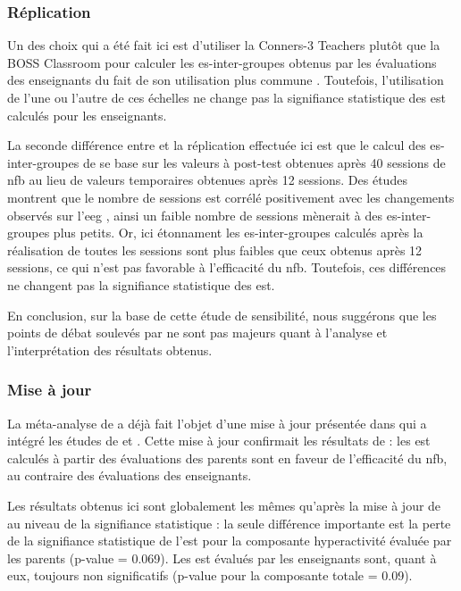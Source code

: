 \begin{itemize}
\subsubsection{Réplication}

Un des choix qui a été fait ici est d'utiliser la Conners-3 Teachers \citep{Conners2008} plutôt que la BOSS Classroom \citep{Shapiro2010} 
pour calculer les \gls{es}-inter-groupes obtenus par les évaluations des enseignants du fait de son utilisation plus commune \citep{Christiansen2014, Bluschke2016}.
Toutefois, l'utilisation de l'une ou l'autre de ces échelles ne change pas la signifiance statistique des \gls{est} calculés pour les enseignants. 

La seconde différence entre \citep{Cortese2016} et la réplication effectuée ici est que le calcul des \gls{es}-inter-groupes de \citet{Arnold2014} se base 
sur les valeurs à post-test obtenues après 40 sessions de \gls{nfb} au lieu de valeurs temporaires obtenues après 12 sessions. Des études montrent
que le nombre de sessions est corrélé positivement avec les changements observés sur l'\gls{eeg} \citep{Vernon2004}, ainsi un faible nombre de sessions mènerait
à des \gls{es}-inter-groupes plus petits. Or, ici étonnament les \gls{es}-inter-groupes calculés après la réalisation de toutes les sessions sont plus faibles que ceux 
obtenus après 12 sessions, ce qui n'est pas favorable à l'efficacité du \gls{nfb}. Toutefois, ces différences ne changent pas la signifiance statistique des \gls{est}. 

En conclusion, sur la base de cette étude de sensibilité, nous suggérons que les points de débat soulevés par \citep{Micoulaud2016} ne sont pas majeurs 
quant à l'analyse et l'interprétation des résultats obtenus.

\subsubsection{Mise à jour}

La méta-analyse de \citep{Cortese2016} a déjà fait l'objet d'une mise à jour présentée dans \citet{Bussalb2019clinical} qui a intégré les études de 
\citep{Bazanova2018, Baumeister2016} et \citet{Strehl2017}. Cette mise à jour confirmait les résultats de \citep{Cortese2016} : les \gls{est} calculés 
à partir des évaluations des parents sont en faveur de l'efficacité du \gls{nfb}, au contraire des évaluations des enseignants. 

Les résultats obtenus ici sont globalement les mêmes qu'après la mise à jour de \citet{Bussalb2019clinical} au niveau de la signifiance statistique : la seule
différence importante est la perte de la signifiance statistique de l'\gls{est} pour la composante hyperactivité évaluée par les parents (p-value = 0.069).
Les \gls{est} évalués par les enseignants sont, quant à eux, toujours non significatifs (p-value pour la composante totale =  0.09). 


\end{itemize}
